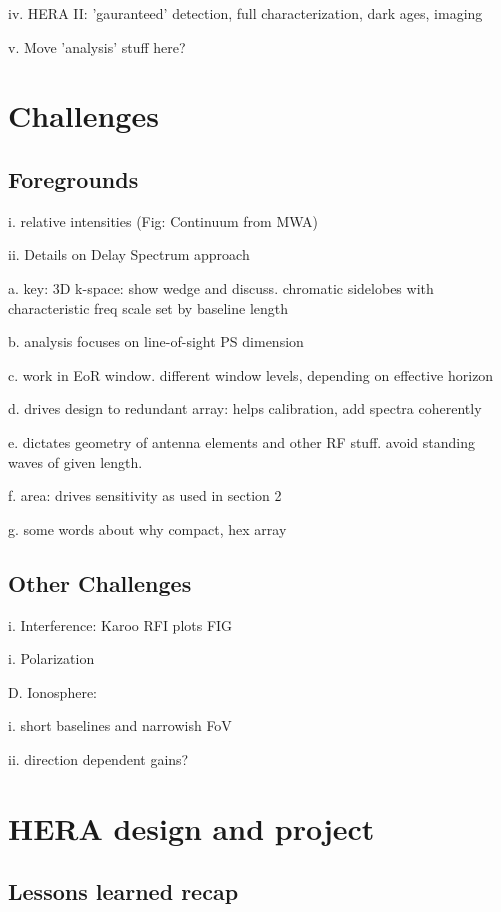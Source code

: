 \documentclass[preprint]{aastex}
\begin{document}
iv. HERA II: 'gauranteed' detection, full characterization, dark ages, imaging

v. Move 'analysis' stuff here?


\section{Challenges} %

\subsection{Foregrounds}  %

i. relative intensities (Fig: Continuum from MWA)

ii. Details on Delay Spectrum approach

a. key: 3D k-space: show wedge and discuss. chromatic sidelobes with characteristic freq scale 
set by baseline length

b. analysis focuses on line-of-sight PS dimension

c. work in EoR window.  different window levels, depending on effective horizon

d. drives design to redundant array: helps calibration, add spectra coherently

e. dictates geometry of antenna elements and other RF stuff. avoid standing waves of given length. 

f. area: drives sensitivity as used in section 2

g. some words about why compact, hex array 

\subsection{Other Challenges} %

i. Interference: Karoo RFI plots  FIG 

i. Polarization 

D. Ionosphere: 

i. short baselines and narrowish FoV

ii. direction dependent gains?


\section{HERA design and project} %

\subsection{Lessons learned recap} %
\end{document}
